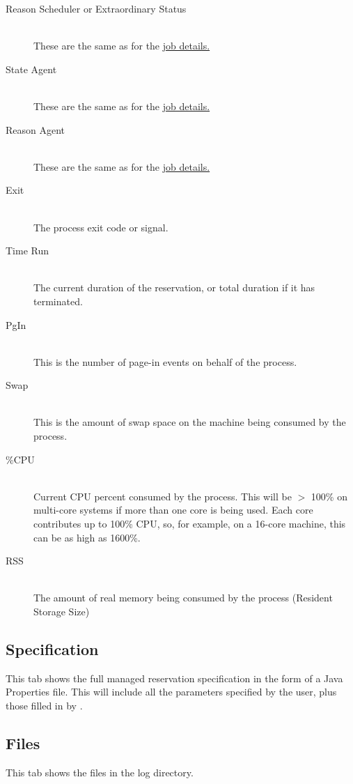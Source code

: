 \begin{description}
      \item[Reason Scheduler or Extraordinary Status] \hfill \\
        These are the same as for the \hyperref[itm:job-details-sched]{job details.}

      \item[State Agent] \hfill \\
        These are the same as for the \hyperref[itm:job-details-state]{job details.}

      \item[Reason Agent] \hfill \\
        These are the same as for the \hyperref[itm:job-details-agent]{job details.}

      \item[Exit] \hfill \\
        The process exit code or signal.

      \item[Time Run] \hfill \\
        The current duration of the reservation, or total duration if it has 
        terminated.
      
      \item[PgIn] \hfill \\
        This is the number of page-in events on behalf of the process.

      \item[Swap] \hfill \\
        This is the amount of swap space on the machine being consumed by the process.
      
      \item[\%CPU] \hfill \\
        Current CPU percent consumed by the process.  This will be $>$ 100\% on 
        multi-core systems if more than one core is being used.  Each core contributes
        up to 100\% CPU, so, for example, on a 16-core machine, this can be as high
        as 1600\%.
      
      \item[RSS] \hfill \\
        The amount of real memory being consumed by the process (Resident Storage Size)

   \end{description}

   \subsection{Specification}
   \label{sec:ws-service-specification}
   This tab shows the full managed reservation specification in the form of a Java Properties
   file.  This will include all the parameters specified by the user, plus those
   filled in by {\DUCC}.
        
   \subsection{Files}
   This tab shows the files in the log directory.
        